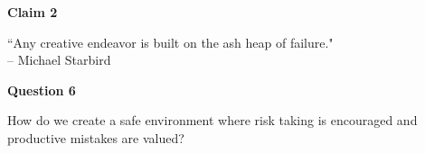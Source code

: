 \documentclass[12pt]{beamer}
\begin{document}

\begin{frame}{\textbf{Claim 2}}

\parbox{\linewidth}{\begin{center}
\Huge ``Any creative endeavor is built on the ash heap of failure."\\ -- Michael Starbird
\end{center}}

\end{frame}


\begin{frame}{\textbf{Question 6}}

\parbox{\linewidth}{\begin{center}
\Huge How do we create a safe environment where risk taking is encouraged and productive mistakes are valued?
\end{center}}

\end{frame}


\end{document}
